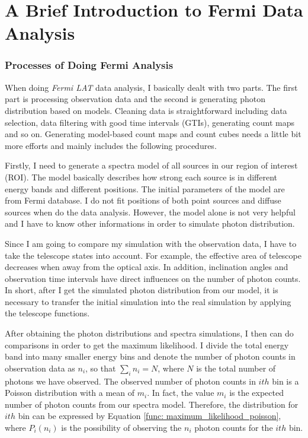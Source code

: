 \documentclass[12pt]{report}
\begin{document}
      \section{A Brief Introduction to Fermi Data Analysis}

        \subsubsection{Processes of Doing Fermi Analysis}
          When doing \textit{Fermi LAT} data analysis, I basically dealt with two parts. The 
          first part is processing observation data and the second is generating photon 
          distribution based on models. Cleaning data is straightforward including data 
          selection, data filtering with good time intervals (GTIs), generating count maps 
          and so on. Generating model-based count maps and count cubes needs a little bit 
          more efforts and mainly includes the following procedures. 

          Firstly, I need to generate a spectra model of all sources in our region of 
          interest (ROI). The model basically describes how strong each source is in 
          different energy bands and different positions. The initial parameters of the 
          model are from Fermi database. I do not fit positions of both point sources and 
          diffuse sources when do the data analysis. However, the model alone is not very 
          helpful and I have to know other informations in order to simulate photon 
          distribution. 

          Since I am going to compare my simulation with the observation data, I have to take 
          the telescope states into account. For example, the effective area of telescope 
          decreases when away from the optical axis. In addition, inclination angles and 
          observation time intervals have direct influences on the number of photon counts. 
          In short, after I get the simulated photon distribution from our model, it is 
          necessary to transfer the initial simulation into the real simulation by applying 
          the telescope functions. 
          
          After obtaining the photon distributions and spectra simulations, 
          I then can do comparisons in order to get the maximum likelihood. I divide the 
          total energy band into many smaller energy bins and denote
          the number of photon counts in observation data as $n_{i}$, so that 
          $\sum_{i}^{}n_{i} = N$, where $N$ is the total number of photons we have observed. 
          The observed number of photon counts in $ith$ bin is a Poisson distribution with a 
          mean of $m_{i}$. In fact, the value $m_{i}$ is the expected number of photon counts 
          from our spectra model. Therefore, the distribution for $ith$
          bin can be expressed by Equation \ref{func: maximum_likelihood_poisson}, where 
          $P_{i}\left(n_{i}\right)$ is the possibility of observing the $n_{i}$ photon counts 
          for the $ith$ bin. 
\end{document}
